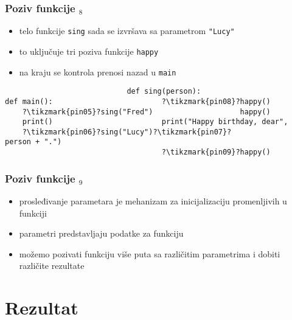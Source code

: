 \documentclass[utf8,compress,aspectratio=169]{beamer}
\begin{document}
\begin{frame}[fragile]
  \frametitle{Poziv funkcije $_8$}
  \begin{itemize}
    \item telo funkcije \texttt{sing} sada se izvršava sa parametrom \texttt{"Lucy"}
    \item to uključuje tri poziva funkcije \texttt{happy}
    \item na kraju se kontrola prenosi nazad u \texttt{main}
  \end{itemize}
\begin{verbatim}
                            def sing(person):
def main():                         ?\tikzmark{pin08}?happy()
    ?\tikzmark{pin05}?sing("Fred")                    happy()
    print()                         print("Happy birthday, dear",
    ?\tikzmark{pin06}?sing("Lucy")?\tikzmark{pin07}?                          person + ".")
                                    ?\tikzmark{pin09}?happy()
\end{verbatim}
\end{frame}

\begin{frame}[fragile]
  \frametitle{Poziv funkcije $_9$}
  \begin{itemize}
    \item prosleđivanje parametara je mehanizam za inicijalizaciju promenljivih u funkciji
    \item parametri predstavljaju  podatke za funkciju
    \item možemo pozivati funkciju više puta sa različitim parametrima i dobiti različite rezultate
  \end{itemize}
\end{frame}

\section{Rezultat}
\end{document}
